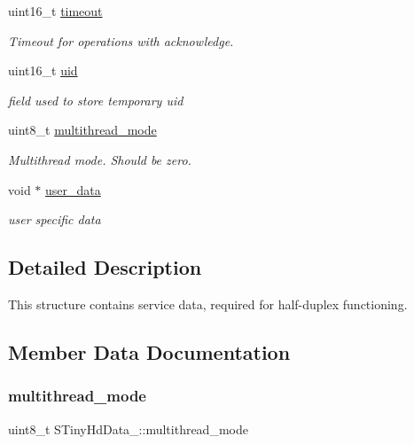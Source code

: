 \begin{DoxyCompactItemize}
uint16\+\_\+t \hyperlink{structSTinyHdData___a7ca4e5b23cf480d93317245010bcbe73}{timeout}
\begin{DoxyCompactList}\small\item\em Timeout for operations with acknowledge. \end{DoxyCompactList}\item 
\mbox{\label{structSTinyHdData___a7084eac08b744ad0aa2624b854866825}} 
uint16\+\_\+t \hyperlink{structSTinyHdData___a7084eac08b744ad0aa2624b854866825}{uid}
\begin{DoxyCompactList}\small\item\em field used to store temporary uid \end{DoxyCompactList}\item 
uint8\+\_\+t \hyperlink{structSTinyHdData___a37dca10adb0dd210f02365b7fa20a598}{multithread\+\_\+mode}
\begin{DoxyCompactList}\small\item\em Multithread mode. Should be zero. \end{DoxyCompactList}\item 
\mbox{\label{structSTinyHdData___a29d80bd96abfa9640bb5c0824416f836}} 
void $\ast$ \hyperlink{structSTinyHdData___a29d80bd96abfa9640bb5c0824416f836}{user\+\_\+data}
\begin{DoxyCompactList}\small\item\em user specific data \end{DoxyCompactList}\end{DoxyCompactItemize}


\subsection{Detailed Description}
This structure contains service data, required for half-\/duplex functioning. 

\subsection{Member Data Documentation}
\mbox{\label{structSTinyHdData___a37dca10adb0dd210f02365b7fa20a598}} 
\subsubsection{\texorpdfstring{multithread\+\_\+mode}{multithread\_mode}}
{\footnotesize\ttfamily uint8\+\_\+t S\+Tiny\+Hd\+Data\+\_\+\+::multithread\+\_\+mode}



